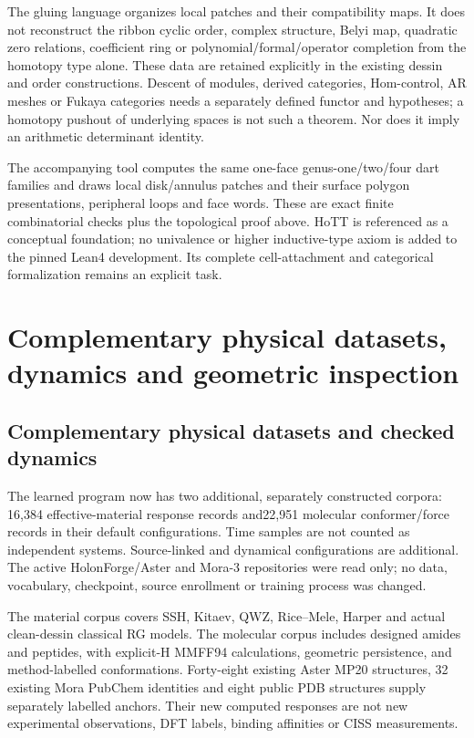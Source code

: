 \documentclass[11pt,oneside,openany]{book}
\theoremstyle{definition}\newtheorem{definition}[theorem]{Definition}
\theoremstyle{remark}\newtheorem{remark}[theorem]{Remark}
\begin{document}
The gluing language organizes local patches and their compatibility maps.
It does not reconstruct the ribbon cyclic order, complex structure, Belyi
map, quadratic zero relations, coefficient ring or polynomial/formal/operator
completion from the homotopy type alone. These data are retained explicitly
in the existing dessin and order constructions. Descent of modules, derived
categories, Hom-control, AR meshes or Fukaya categories needs a separately
defined functor and hypotheses; a homotopy pushout of underlying spaces is
not such a theorem. Nor does it imply an arithmetic determinant identity.

The accompanying tool computes the same one-face genus-one/two/four dart
families and draws local disk/annulus patches and their surface polygon
presentations, peripheral loops and face words. These
are exact finite combinatorial checks plus the topological proof above.
HoTT is referenced as a conceptual foundation; no univalence or higher
inductive-type axiom is added to the pinned Lean4 development. Its complete
cell-attachment and categorical formalization remains an explicit task.


\chapter{Complementary physical datasets, dynamics and geometric inspection}
\section{Complementary physical datasets and checked dynamics}
The learned program now has two additional, separately constructed corpora:
16,384 effective-material response records and22,951 molecular conformer/force
records in their default configurations. Time samples are not counted as
independent systems. Source-linked and dynamical configurations are additional.
The active HolonForge/Aster and Mora-3 repositories were read only; no data,
vocabulary, checkpoint, source enrollment or training process was changed.

The material corpus covers SSH, Kitaev, QWZ, Rice--Mele, Harper and actual
clean-dessin classical RG models. The molecular corpus includes designed
amides and peptides, with explicit-H MMFF94 calculations, geometric persistence,
and method-labelled conformations. Forty-eight existing Aster MP20 structures,
32 existing Mora PubChem identities and eight public PDB structures supply
separately labelled anchors. Their new computed responses are not new
experimental observations, DFT labels, binding affinities or CISS measurements.
\end{document}
